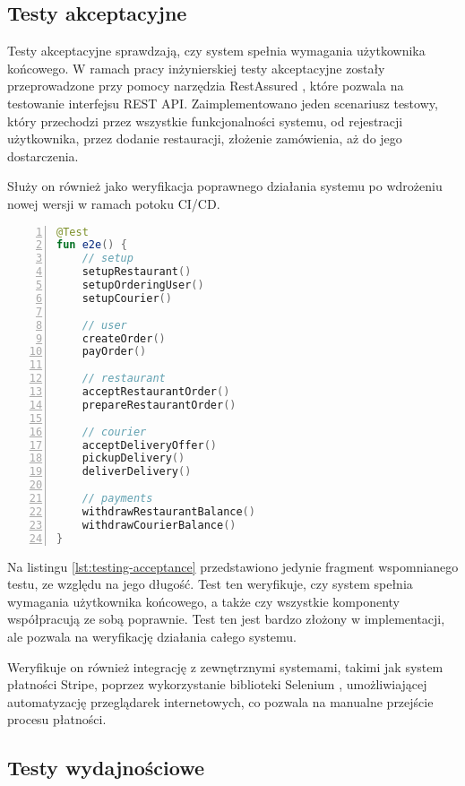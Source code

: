 \subsection{Testy akceptacyjne}

Testy akceptacyjne sprawdzają, czy system spełnia wymagania użytkownika końcowego. W ramach pracy inżynierskiej testy akceptacyjne zostały przeprowadzone przy pomocy narzędzia RestAssured \cite{restassured}, które pozwala na testowanie interfejsu REST API. Zaimplementowano jeden scenariusz testowy, który przechodzi przez wszystkie funkcjonalności systemu, od rejestracji użytkownika, przez dodanie restauracji, złożenie zamówienia, aż do jego dostarczenia.

Służy on również jako weryfikacja poprawnego działania systemu po wdrożeniu nowej wersji w ramach potoku CI/CD.

\begin{lstlisting}[caption={Scenariusz testowy w ramach testów akceptacyjnych},label={lst:testing-acceptance},captionpos=b,language=Kotlin,numbers=left]
@Test
fun e2e() {
    // setup
    setupRestaurant()
    setupOrderingUser()
    setupCourier()

    // user
    createOrder()
    payOrder()

    // restaurant
    acceptRestaurantOrder()
    prepareRestaurantOrder()

    // courier
    acceptDeliveryOffer()
    pickupDelivery()
    deliverDelivery()

    // payments
    withdrawRestaurantBalance()
    withdrawCourierBalance()
}
\end{lstlisting}

Na listingu \ref{lst:testing-acceptance} przedstawiono jedynie fragment wspomnianego testu, ze względu na jego długość. Test ten weryfikuje, czy system spełnia wymagania użytkownika końcowego, a także czy wszystkie komponenty współpracują ze sobą poprawnie. Test ten jest bardzo złożony w implementacji, ale pozwala na weryfikację działania całego systemu.

Weryfikuje on również integrację z zewnętrznymi systemami, takimi jak system płatności Stripe, poprzez wykorzystanie biblioteki Selenium \cite{selenium}, umożliwiającej automatyzację przeglądarek internetowych, co pozwala na manualne przejście procesu płatności.

\subsection{Testy wydajnościowe}

